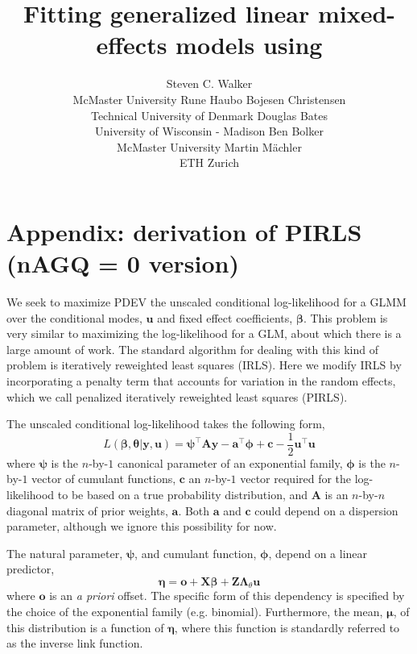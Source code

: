 \documentclass{jss}
\author{
  Steven C. Walker\\McMaster University \And
  Rune Haubo Bojesen Christensen\\Technical University of Denmark\AND
  Douglas Bates\\University of Wisconsin - Madison \And
  Ben Bolker\\McMaster University \AND
  Martin M\"achler\\ETH Zurich
}
\title{Fitting generalized linear \bmb{and nonlinear?} mixed-effects models using \pkg{lme4}}
\begin{document}

\section{Appendix: derivation of PIRLS (nAGQ = 0 version)}

We seek to maximize PDEV the unscaled conditional log-likelihood 
for a GLMM over the conditional modes, $\bm u$ and fixed effect
coefficients, $\bm\beta$. This problem is very similar to maximizing
the log-likelihood for a GLM, about which there is a large amount of
work. The standard algorithm for dealing with this kind of problem is
iteratively reweighted least squares (IRLS). Here we modify IRLS by
incorporating a penalty term that accounts for variation in the random
effects, which we call penalized iteratively reweighted least squares (PIRLS). 

The unscaled conditional log-likelihood takes the following form,
\begin{equation}
L(\bm\beta, \bm\theta | \bm y, \bm u) = 
\bm\psi^\top \bm A \bm y - 
\bm a^\top \bm \phi  + 
\bm c -
\frac{1}{2}\bm u^\top \bm u
\end{equation}
where $\bm\psi$ is the $n$-by-$1$ canonical parameter of an exponential family,
$\bm\phi$ is the $n$-by-$1$ vector of cumulant functions, $\bm c$ an
$n$-by-$1$ vector required for the log-likelihood to be based on a
true probability distribution, and $\bm A$ is an $n$-by-$n$ diagonal
matrix of prior weights, $\bm a$. Both $\bm a$ and $\bm c$ could depend on a dispersion
parameter, although we ignore this possibility for now.

The natural parameter, $\bm\psi$, and cumulant function, $\bm\phi$,
depend on a linear predictor,
\begin{equation}
\bm\eta = \bm o + \bm X \bm\beta + \bm Z \bm\Lambda_\theta \bm u
\end{equation}
where $\bm o$ is an \emph{a priori} offset. The specific form of this
dependency is specified by the choice of the exponential family
(e.g. binomial). Furthermore, the mean, $\bm\mu$, of this distribution
is a function of $\bm\eta$, where this function is standardly referred
to as the inverse link function.
\end{document}
